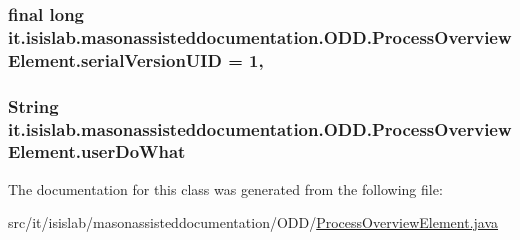 \hypertarget{classit_1_1isislab_1_1masonassisteddocumentation_1_1_o_d_d_1_1_process_overview_element_a701ffecb0c1bf255ae7c1f0528eb6737}{
\subsubsection[{serial\-Version\-U\-I\-D}]{\setlength{\rightskip}{0pt plus 5cm}final long it.\-isislab.\-masonassisteddocumentation.\-O\-D\-D.\-Process\-Overview\-Element.\-serial\-Version\-U\-I\-D = 1\hspace{0.3cm}{\ttfamily [static]}, {\ttfamily [private]}}}\label{classit_1_1isislab_1_1masonassisteddocumentation_1_1_o_d_d_1_1_process_overview_element_a701ffecb0c1bf255ae7c1f0528eb6737}
\hypertarget{classit_1_1isislab_1_1masonassisteddocumentation_1_1_o_d_d_1_1_process_overview_element_ab39c20998999736850ea082841f50d13}{
\subsubsection[{user\-Do\-What}]{\setlength{\rightskip}{0pt plus 5cm}String it.\-isislab.\-masonassisteddocumentation.\-O\-D\-D.\-Process\-Overview\-Element.\-user\-Do\-What\hspace{0.3cm}{\ttfamily [package]}}}\label{classit_1_1isislab_1_1masonassisteddocumentation_1_1_o_d_d_1_1_process_overview_element_ab39c20998999736850ea082841f50d13}


The documentation for this class was generated from the following file\-:\begin{DoxyCompactItemize}
\item 
src/it/isislab/masonassisteddocumentation/\-O\-D\-D/\hyperlink{_process_overview_element_8java}{Process\-Overview\-Element.\-java}\end{DoxyCompactItemize}
